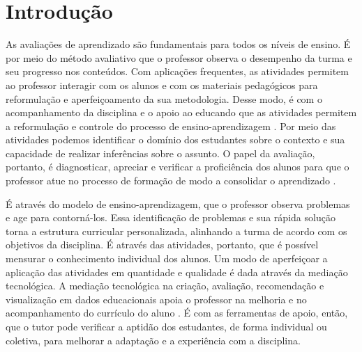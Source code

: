 \chapter{Introdução}
\label{cap-intro}

\begin{comment}
O documento é organizado em capítulos (\texttt{\textbackslash chapter\{\}}), seções (\texttt{\textbackslash section\{\}}), subseções (\texttt{\textbackslash subsection\{\}}), sub-subseções (\texttt{\textbackslash subsubsection\{\}}) e assim por diante. Atenção, porém, a não criar estruturas muito profundas (sub-sub-sub-...) pois o documento não fica bem estruturado.
\end{comment}

As avaliações de aprendizado são fundamentais para todos os níveis de ensino. É por meio do método avaliativo que o professor observa o desempenho da turma e seu progresso nos conteúdos. Com aplicações frequentes, as atividades permitem ao professor interagir com os alunos e com os materiais pedagógicos para reformulação e aperfeiçoamento da sua metodologia. Desse modo, é com o acompanhamento da disciplina e o apoio ao educando que as atividades permitem a reformulação e controle do processo de ensino-aprendizagem \cite{barreira2006}. Por meio das atividades podemos identificar o domínio dos estudantes sobre o contexto e sua capacidade de realizar inferências sobre o assunto. O papel da avaliação, portanto, é diagnosticar, apreciar e verificar a proficiência dos alunos para que o professor atue no processo de formação de modo a consolidar o aprendizado \cite{oliveira2005}.


É através do modelo de ensino-aprendizagem, que o professor observa problemas e age para contorná-los. Essa identificação de problemas e sua rápida solução torna a estrutura curricular personalizada, alinhando a turma de acordo com os objetivos da disciplina. É através das atividades, portanto, que é possível mensurar o conhecimento individual dos alunos. Um modo de aperfeiçoar a aplicação das atividades em quantidade e qualidade é dada através da mediação tecnológica. A mediação tecnológica na criação, avaliação, recomendação e visualização em dados educacionais apoia o professor na melhoria e no acompanhamento do currículo do aluno \cite{paiva2012}. É com as ferramentas de apoio, então, que o tutor pode verificar a aptidão dos estudantes, de forma individual ou coletiva, para melhorar a adaptação e a experiência com a disciplina.

